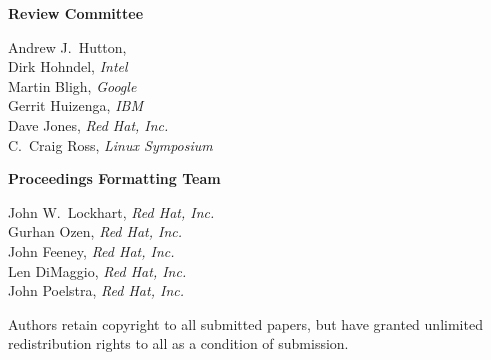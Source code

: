 \documentclass[twoside,12pt]{book}
\begin{document}
\vspace{1cm}
\textbf{{\Large Review Committee}}

\vspace{5mm}
\begin{large}
\begin{raggedright}
\hspace*{0.5in}Andrew J.\ Hutton, \\[1ex]
\hspace*{0.5in}Dirk Hohndel, \textit{Intel}\\
\hspace*{0.5in}Martin Bligh, \textit{Google}\\
\hspace*{0.5in}Gerrit Huizenga, \textit{IBM}\\
\hspace*{0.5in}Dave Jones, \textit{Red Hat, Inc.}\\
\hspace*{0.5in}C.\ Craig Ross, \textit{Linux Symposium}\\
\end{raggedright}
\end{large}

\vspace{1cm}

\textbf{{\Large Proceedings Formatting Team}}

\vspace{5mm}
\begin{large}
\begin{raggedright}
\hspace*{0.5in}John W.\ Lockhart, \textit{Red Hat, Inc.}\\
\hspace*{0.5in}Gurhan Ozen, \textit{Red Hat, Inc.}\\
\hspace*{0.5in}John Feeney, \textit{Red Hat, Inc.}\\
\hspace*{0.5in}Len DiMaggio, \textit{Red Hat, Inc.}\\
\hspace*{0.5in}John Poelstra, \textit{Red Hat, Inc.}\\
\end{raggedright}
\end{large}

\vspace{3.0in}

\vspace*{\fill}

\begin{center}
Authors retain copyright to all submitted papers, but have granted 
unlimited redistribution rights to all as a condition of submission.
\end{center}
\cleardoublepage
\end{document}
